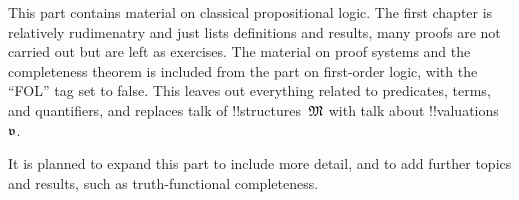 \documentclass[../../include/open-logic-part]{subfiles}
\begin{document}

\begin{editorial}
  This part contains material on classical propositional logic. The
  first chapter is relatively rudimenatry and just lists definitions
  and results, many proofs are not carried out but are left as
  exercises. The material on proof systems and the completeness
  theorem is included from the part on first-order logic, with the
  ``FOL'' tag set to false. This leaves out everything related to
  predicates, terms, and quantifiers, and replaces talk of
  !!{structure}s~$\Struct{M}$ with talk about
  !!{valuation}s~$\pAssign{v}$.

  It is planned to expand this part to include
  more detail, and to add further topics and results, such as
  truth-functional completeness.
\end{editorial}










\OLEndPartHook
\end{document}
